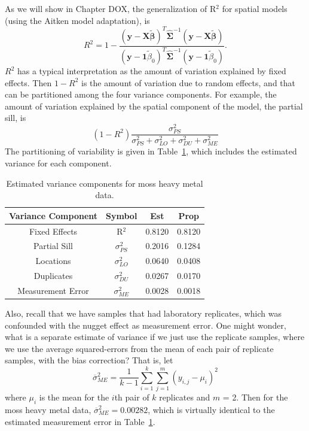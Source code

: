 \documentclass[12pt, titlepage]{article}
\begin{document}
As we will show in Chapter DOX, the generalization of R$^{2}$ for spatial models (using the Aitken model adaptation), is
$$
R^{2} = 1-\frac{(\mathbf{y} - \mathbf{X}\tilde{\boldsymbol{\beta}})^{T}\hat{\boldsymbol{\Sigma}}^{-1}(\mathbf{y} - \mathbf{X}\tilde{\boldsymbol{\beta}})}{(\mathbf{y} - \mathbf{1}\tilde{\beta}_{0})^{T}\hat{\boldsymbol{\Sigma}}^{-1}(\mathbf{y} - \mathbf{1}\tilde{\beta}_{0})}.
$$
$R^{2}$ has a typical interpretation as the amount of variation explained by fixed effects.  Then $1 - R^{2}$ is the amount of variation due to random effects, and that can be partitioned among the four variance components.  For example, the amount of variation explained by the spatial component of the model, the partial sill, is
$$
(1 - R^{2})\frac{\sigma^{2}_{PS}}{\sigma^{2}_{PS} + \sigma^{2}_{LO} + \sigma^{2}_{DU} + \sigma^{2}_{ME}}
$$
The partitioning of variability is given in Table~\ref{tab:mossVC}, which includes the estimated variance for each component.
\begin{table}[H] 
	\caption{Estimated variance components for moss heavy metal data. \label{tab:mossVC}}
\begin{center}
\begin{tabular}{|c|c|cc|}
  \hline
  \hline
  Variance Component & Symbol & Est & Prop \\
	\hline
  \hline
  Fixed Effects & R$^{2}$ & 0.8120 & 0.8120 \\
	Partial Sill & $\sigma^{2}_{PS}$ & 0.2016 & 0.1284  \\ 
	Locations & $\sigma^{2}_{LO}$ & 0.0640 & 0.0408 \\ 
	Duplicates & $\sigma^{2}_{DU}$ & 0.0267 & 0.0170 \\ 
	Measurement Error & $\sigma^{2}_{ME}$ & 0.0028 & 0.0018  \\ 
  \hline
  \hline
\end{tabular}
\end{center}
\end{table}
Also, recall that we have samples that had laboratory replicates, which was confounded with the nugget effect as measurement error.  One might wonder, what is a separate estimate of variance if we just use the replicate samples, where we use the average squared-errors from the mean of each pair of replicate samples, with the bias correction?  That is, let
$$
\overline{\sigma}^{2}_{ME} = \frac{1}{k-1}\sum_{i=1}^{k}\sum_{j=1}^{m}(y_{i,j} - \mu_{i})^{2}
$$
where $\mu_{i}$ is the mean for the $i$th pair of $k$ replicates and $m$ = 2.  Then for the moss heavy metal data, $\overline{\sigma}^{2}_{ME} = 0.00282$, which is virtually identical to the estimated measurement error in Table~\ref{tab:mossVC}.
\end{document}
